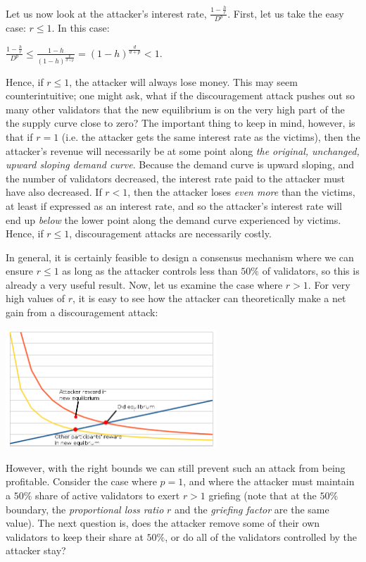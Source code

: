 \documentclass[12pt]{article}
\begin{document}
Let us now look at the attacker's interest rate, $\frac{1-\frac{h}{r}}{D^p}$. First, let us take the easy case: $r \le 1$. In this case:

$\frac{1-\frac{h}{r}}{D^p} \le \frac{1-h}{(1-h)^{\frac{p}{d+p}}} = (1-h)^{\frac{d}{d+p}} < 1$.

Hence, if $r \le 1$, the attacker will always lose money. This may seem counterintuitive; one might ask, what if the discouragement attack pushes out so many other validators that the new equilibrium is on the very high part of the the supply curve close to zero? The important thing to keep in mind, however, is that if $r = 1$ (i.e. the attacker gets the same interest rate as the victims), then the attacker's revenue will necessarily be at some point along \textit{the original, unchanged, upward sloping demand curve}. Because the demand curve is upward sloping, and the number of validators decreased, the interest rate paid to the attacker must have also decreased. If $r < 1$, then the attacker loses \textit{even more} than the victims, at least if expressed as an interest rate, and so the attacker's interest rate will end up \textit{below} the lower point along the demand curve experienced by victims. Hence, if $r \le 1$, discouragement attacks are necessarily costly.

In general, it is certainly feasible to design a consensus mechanism where we can ensure $r \le 1$ as long as the attacker controls less than $50\%$ of validators, so this is already a very useful result. Now, let us examine the case where $r > 1$. For very high values of $r$, it is easy to see how the attacker can theoretically make a net gain from a discouragement attack:

\includegraphics[width=300px]{disc_chart3.png}



However, with the right bounds we can still prevent such an attack from being profitable. Consider the case where $p=1$, and where the attacker must maintain a $50\%$ share of active validators to exert $r > 1$ griefing (note that at the $50\%$ boundary, the \textit{proportional loss ratio} $r$ and the \textit{griefing factor} are the same value). The next question is, does the attacker remove some of their own validators to keep their share at $50\%$, or do all of the validators controlled by the attacker stay?
\end{document}
